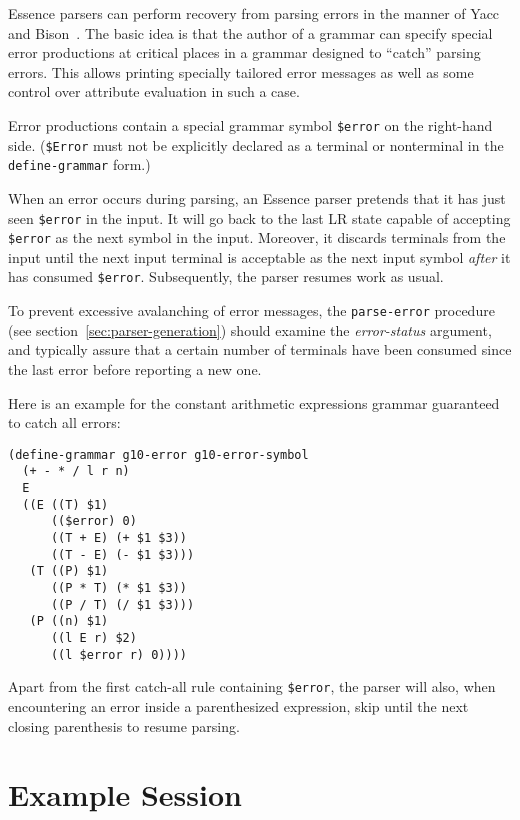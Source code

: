 \documentclass{article}
\newcommand{\var}[1]{\textit{#1}}
\newcommand{\codefont}[1]{\texttt{#1}}
\begin{document}
Essence parsers can perform recovery from parsing errors in the manner
of Yacc~\cite{Johnson1975} and Bison~\cite{DonnellyStallman1995}.  The
basic idea is that the author of a grammar can specify special
error productions at critical places in a grammar designed to ``catch''
parsing errors.  This allows printing specially tailored error
messages as well as some control over attribute evaluation in such a
case.

Error productions contain a special grammar symbol \codefont{\$error}
on the right-hand side.  (\codefont{\$Error} must not be explicitly
declared as a terminal or nonterminal in the \codefont{define-grammar}
form.)

When an error occurs during parsing, an Essence parser pretends that
it has just seen \codefont{\$error} in the input.  It will go back to
the last LR state capable of accepting \codefont{\$error} as the next
symbol in the input.  Moreover, it discards terminals from the input
until the next input terminal is acceptable as the next input symbol
\emph{after} it has consumed \codefont{\$error}.  Subsequently, the
parser resumes work as usual.

To prevent excessive avalanching of error messages, the
\codefont{parse-error} procedure (see
section~\ref{sec:parser-generation}) should examine the
\var{error-status} argument, and typically assure that a certain
number of terminals have been consumed since the last error before
reporting a new one.

Here is an example for the constant arithmetic expressions grammar
guaranteed to catch all errors:
%
\begin{verbatim}
(define-grammar g10-error g10-error-symbol
  (+ - * / l r n)
  E
  ((E ((T) $1)
      (($error) 0)
      ((T + E) (+ $1 $3))
      ((T - E) (- $1 $3)))
   (T ((P) $1)
      ((P * T) (* $1 $3))
      ((P / T) (/ $1 $3)))
   (P ((n) $1)
      ((l E r) $2)
      ((l $error r) 0))))
\end{verbatim}
%
Apart from the first catch-all rule containing \codefont{\$error}, the
parser will also, when encountering an error inside a parenthesized
expression, skip until the next closing parenthesis to resume parsing.


\section{Example Session}
\label{sec:example-session}
\end{document}
